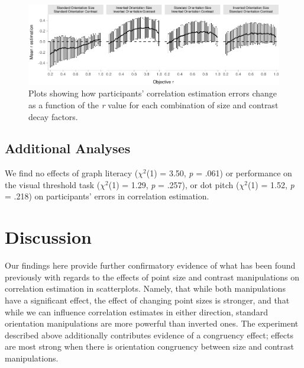 \documentclass[manuscript, review, anonymous, screen]{acmart}
\begin{document}
\begin{figure}

{\centering \includegraphics[width=1\textwidth,height=\textheight]{size_and_contrast_new_files/figure-pdf/fig-diff-error-bars-plot-1.pdf}

}

\caption{\label{fig-diff-error-bars-plot}Plots showing how participants'
correlation estimation errors change as a function of the \emph{r} value
for each combination of size and contrast decay factors.}

\end{figure}

\hypertarget{sec-add-analyses}{%
\subsection{Additional Analyses}\label{sec-add-analyses}}

We find no effects of graph literacy (\(\chi^2\)(1) = 3.50, \emph{p} =
.061) or performance on the visual threshold task (\(\chi^2\)(1) = 1.29,
\emph{p} = .257), or dot pitch (\(\chi^2\)(1) = 1.52, \emph{p} = .218)
on participants' errors in correlation estimation.

\hypertarget{sec-discussion}{%
\section{Discussion}\label{sec-discussion}}

Our findings here provide further confirmatory evidence of what has been
found previously with regards to the effects of point size and contrast
manipulations on correlation estimation in scatterplots. Namely, that
while both manipulations have a significant effect, the effect of
changing point sizes is stronger, and that while we can influence
correlation estimates in either direction, standard orientation
manipulations are more powerful than inverted ones. The experiment
described above additionally contributes evidence of a congruency
effect; effects are most strong when there is orientation congruency
between size and contrast manipulations.
\end{document}
